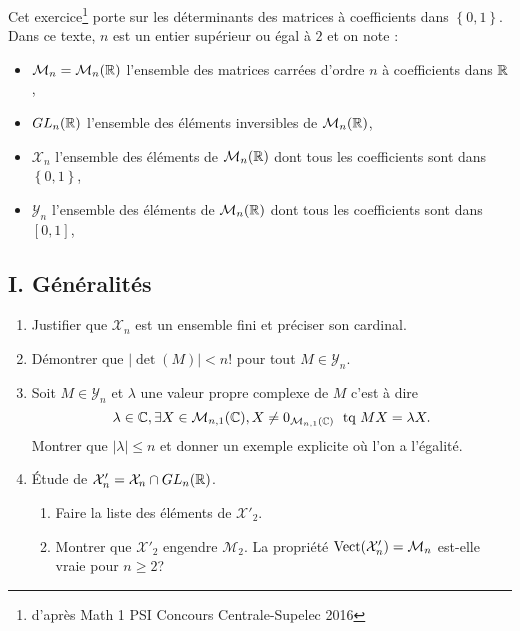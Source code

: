 Cet exercice\footnote{d'après Math 1 PSI Concours Centrale-Supelec 2016} porte sur les déterminants des matrices à coefficients dans $\left\lbrace 0,1\right\rbrace$. Dans ce texte, $n$ est un entier supérieur ou égal à $2$ et on note :
\begin{itemize}
  \item $\mathcal{M}_{n}=\mathcal{M}_{n}(\mathbb{R})$ l'ensemble des matrices carrées d'ordre $n$ à coefficients dans $\mathbb{R}$,
  \item $GL_n(\mathbb{R})$ l'ensemble des éléments inversibles de $\mathcal{M}_n(\mathbb{R})$,
  \item $\mathcal{X}_n$ l'ensemble des éléments de $\mathcal{M}_n(\mathbb{R})$ dont tous les coefficients sont dans $\left\lbrace 0,1\right\rbrace$, 
  \item $\mathcal{Y}_n$ l'ensemble des éléments de $\mathcal{M}_n(\mathbb{R})$ dont tous les coefficients sont dans $\left[  0,1 \right] $,
\end{itemize}

\subsection*{I. Généralités}
\begin{enumerate}
  \item Justifier que $\mathcal{X}_n$ est un ensemble fini et préciser son cardinal.
  \item Démontrer que $|\det(M)| < n!$ pour tout $M\in \mathcal{Y}_n$.
  \item Soit $M\in \mathcal{Y}_n$ et $\lambda$ une valeur propre complexe de $M$ c'est à dire
\begin{displaymath}
\lambda \in \mathbb{C}, \exists X\in \mathcal{M}_{n,1}(\mathbb{C}), X\neq 0_{\mathcal{M}_{n,1}(\mathbb{C})}\; \text{ tq } MX = \lambda X  .
\end{displaymath}
Montrer que $|\lambda|\leq n$ et donner un exemple explicite où l'on a l'égalité.
  \item \'Etude de $\mathcal{X}'_n = \mathcal{X}_n \cap GL_n(\mathbb{R})$.
\begin{enumerate}
  \item Faire la liste des éléments de $\mathcal{X}'_2$.
  \item Montrer que $\mathcal{X}'_2$ engendre $\mathcal{M}_2$. La propriété $\operatorname{Vect}(\mathcal{X}'_n) = \mathcal{M}_n$ est-elle vraie pour $n\geq 2$? 
\end{enumerate}
\end{enumerate}

